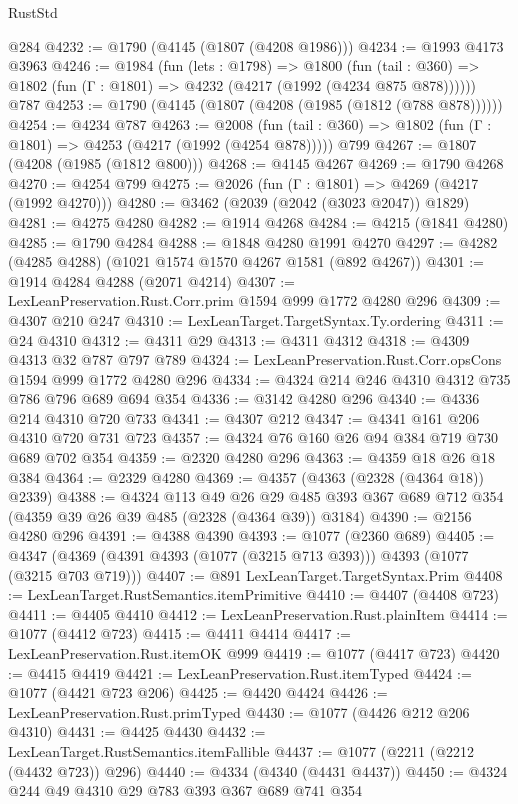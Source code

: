 \begin{lexlean}{RustStd}
\begin{coremodule}
    @284
@4232 := @1790 (@4145 (@1807 (@4208 @1986)))
@4234 := @1993 @4173 @3963
@4246 := @1984
    (fun (lets : @1798) =>
    @1800 (fun (tail : @360) => @1802 (fun (Γ : @1801) => @4232 (@4217 (@1992 (@4234 @875 @878))))))
    @787
@4253 := @1790 (@4145 (@1807 (@4208 (@1985 (@1812 (@788 @878))))))
@4254 := @4234 @787
@4263 := @2008
    (fun (tail : @360) => @1802 (fun (Γ : @1801) => @4253 (@4217 (@1992 (@4254 @878)))))
    @799
@4267 := @1807 (@4208 (@1985 (@1812 @800)))
@4268 := @4145 @4267
@4269 := @1790 @4268
@4270 := @4254 @799
@4275 := @2026 (fun (Γ : @1801) => @4269 (@4217 (@1992 @4270)))
@4280 := @3462 (@2039 (@2042 (@3023 @2047)) @1829)
@4281 := @4275 @4280
@4282 := @1914 @4268
@4284 := @4215 (@1841 @4280)
@4285 := @1790 @4284
@4288 := @1848 @4280 @1991 @4270
@4297 := @4282 (@4285 @4288) (@1021 @1574 @1570 @4267 @1581 (@892 @4267))
@4301 := @1914 @4284 @4288 (@2071 @4214)
@4307 := LexLeanPreservation.Rust.Corr.prim @1594 @999 @1772 @4280 @296
@4309 := @4307 @210 @247
@4310 := LexLeanTarget.TargetSyntax.Ty.ordering
@4311 := @24 @4310
@4312 := @4311 @29
@4313 := @4311 @4312
@4318 := @4309 @4313 @32 @787 @797 @789
@4324 := LexLeanPreservation.Rust.Corr.opsCons @1594 @999 @1772 @4280 @296
@4334 := @4324 @214 @246 @4310 @4312 @735 @786 @796 @689 @694 @354
@4336 := @3142 @4280 @296
@4340 := @4336 @214 @4310 @720 @733
@4341 := @4307 @212
@4347 := @4341 @161 @206 @4310 @720 @731 @723
@4357 := @4324 @76 @160 @26 @94 @384 @719 @730 @689 @702 @354
@4359 := @2320 @4280 @296
@4363 := @4359 @18 @26 @18 @384
@4364 := @2329 @4280
@4369 := @4357 (@4363 (@2328 (@4364 @18)) @2339)
@4388 := @4324
    @113
    @49
    @26
    @29
    @485
    @393
    @367
    @689
    @712
    @354
    (@4359 @39 @26 @39 @485 (@2328 (@4364 @39)) @3184)
@4390 := @2156 @4280 @296
@4391 := @4388 @4390
@4393 := @1077 (@2360 @689)
@4405 := @4347 (@4369 (@4391 @4393 (@1077 (@3215 @713 @393))) @4393 (@1077 (@3215 @703 @719)))
@4407 := @891 LexLeanTarget.TargetSyntax.Prim
@4408 := LexLeanTarget.RustSemantics.itemPrimitive
@4410 := @4407 (@4408 @723)
@4411 := @4405 @4410
@4412 := LexLeanPreservation.Rust.plainItem
@4414 := @1077 (@4412 @723)
@4415 := @4411 @4414
@4417 := LexLeanPreservation.Rust.itemOK @999
@4419 := @1077 (@4417 @723)
@4420 := @4415 @4419
@4421 := LexLeanPreservation.Rust.itemTyped
@4424 := @1077 (@4421 @723 @206)
@4425 := @4420 @4424
@4426 := LexLeanPreservation.Rust.primTyped
@4430 := @1077 (@4426 @212 @206 @4310)
@4431 := @4425 @4430
@4432 := LexLeanTarget.RustSemantics.itemFallible
@4437 := @1077 (@2211 (@2212 (@4432 @723)) @296)
@4440 := @4334 (@4340 (@4431 @4437))
@4450 := @4324 @244 @49 @4310 @29 @783 @393 @367 @689 @741 @354

\end{coremodule}
\end{lexlean}
